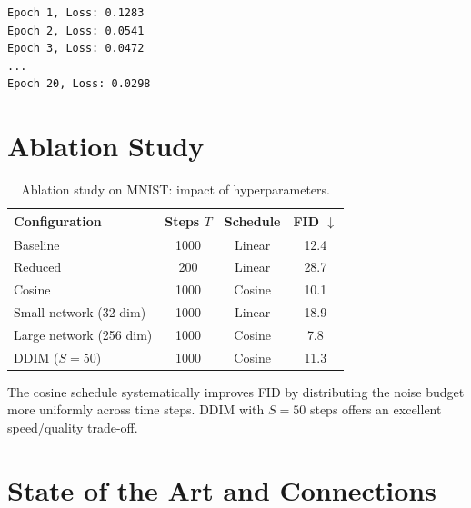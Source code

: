\begin{codeoutput}
\begin{verbatim}
Epoch 1, Loss: 0.1283
Epoch 2, Loss: 0.0541
Epoch 3, Loss: 0.0472
...
Epoch 20, Loss: 0.0298
\end{verbatim}
\end{codeoutput}

\section{Ablation Study}
\label{sec:diffusion-ablation}

\begin{table}[htbp]
\centering
\caption{Ablation study on MNIST: impact of hyperparameters.}
\label{tab:diffusion-ablation}
\begin{tabular}{lccc}
\toprule
\textbf{Configuration} & \textbf{Steps $T$} & \textbf{Schedule} & \textbf{FID $\downarrow$} \\
\midrule
Baseline                & 1000             & Linear             & 12.4 \\
Reduced                 & 200              & Linear             & 28.7 \\
Cosine                  & 1000             & Cosine             & 10.1 \\
Small network (32 dim)  & 1000             & Linear             & 18.9 \\
Large network (256 dim) & 1000             & Cosine             & 7.8 \\
DDIM ($S=50$)           & 1000             & Cosine             & 11.3 \\
\bottomrule
\end{tabular}
\end{table}

\begin{remark}
The cosine schedule systematically improves FID by distributing
the noise budget more uniformly across time steps. DDIM with $S=50$
steps offers an excellent speed/quality trade-off.
\end{remark}

\section{State of the Art and Connections}
\label{sec:diffusion-sota}

